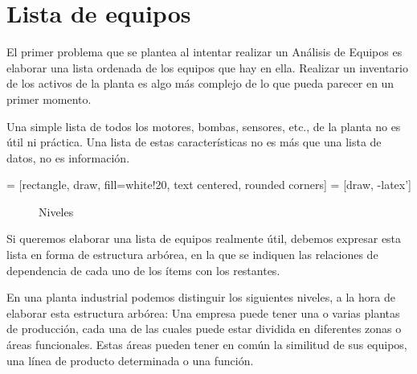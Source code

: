 \section{Lista de equipos}

El primer problema que se plantea al intentar realizar un Análisis de
Equipos es elaborar una lista ordenada de los equipos que hay en ella.
Realizar un inventario de los activos de la planta es algo más complejo 
de lo que pueda parecer en un primer momento.

Una simple lista de todos los motores, bombas, sensores, etc., de la planta no es útil ni práctica.
Una lista de estas características no es más que una
lista de datos, no es información.


 = [rectangle, draw, fill=white!20, text centered, rounded corners]
 = [draw, -latex']

\begin{figure}[h]
    \centering
    
    \caption{Niveles}
    \label{fig:my_label}
\end{figure}

Si queremos elaborar una lista de equipos
realmente útil, debemos expresar esta lista en forma de estructura arbórea, en
la que se indiquen las relaciones de dependencia de cada uno de los ítems con
los restantes.

En una planta industrial podemos distinguir los siguientes niveles, a la
hora de elaborar esta estructura arbórea:
Una empresa puede tener una o varias plantas de producción, cada una de
las cuales puede estar dividida en diferentes zonas o áreas funcionales. Estas
áreas pueden tener en común la similitud de sus equipos, una línea de producto 
determinada o una función. 

